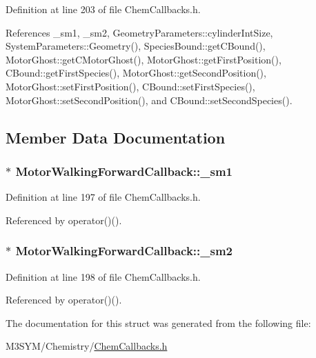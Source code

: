 Definition at line 203 of file Chem\+Callbacks.\+h.



References \+\_\+sm1, \+\_\+sm2, Geometry\+Parameters\+::cylinder\+Int\+Size, System\+Parameters\+::\+Geometry(), Species\+Bound\+::get\+C\+Bound(), Motor\+Ghost\+::get\+C\+Motor\+Ghost(), Motor\+Ghost\+::get\+First\+Position(), C\+Bound\+::get\+First\+Species(), Motor\+Ghost\+::get\+Second\+Position(), Motor\+Ghost\+::set\+First\+Position(), C\+Bound\+::set\+First\+Species(), Motor\+Ghost\+::set\+Second\+Position(), and C\+Bound\+::set\+Second\+Species().



\subsection{Member Data Documentation}
\hypertarget{structMotorWalkingForwardCallback_abd0c24b9f2cda56144f9fec0421e3c42}{
\subsubsection[{\+\_\+sm1}]{$\ast$ Motor\+Walking\+Forward\+Callback\+::\+\_\+sm1}}\label{structMotorWalkingForwardCallback_abd0c24b9f2cda56144f9fec0421e3c42}


Definition at line 197 of file Chem\+Callbacks.\+h.



Referenced by operator()().

\hypertarget{structMotorWalkingForwardCallback_a1c1d1deb98e90fd90f57791705152873}{
\subsubsection[{\+\_\+sm2}]{$\ast$ Motor\+Walking\+Forward\+Callback\+::\+\_\+sm2}}\label{structMotorWalkingForwardCallback_a1c1d1deb98e90fd90f57791705152873}


Definition at line 198 of file Chem\+Callbacks.\+h.



Referenced by operator()().



The documentation for this struct was generated from the following file\+:\begin{DoxyCompactItemize}
\item 
M3\+S\+Y\+M/\+Chemistry/\hyperlink{ChemCallbacks_8h}{Chem\+Callbacks.\+h}\end{DoxyCompactItemize}
